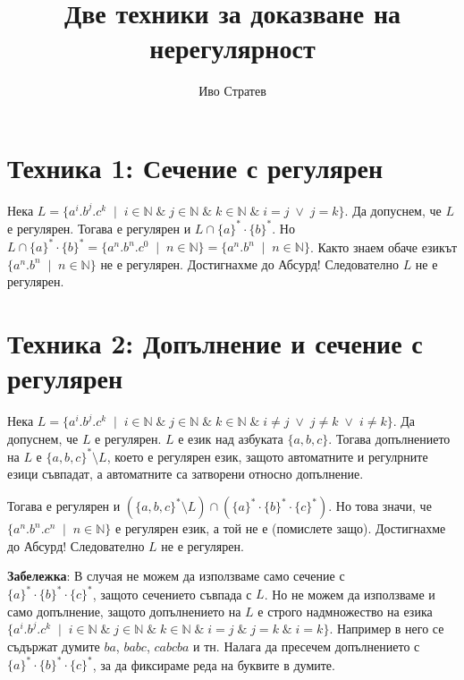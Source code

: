 \documentclass[12pt]{article}
\title{Две техники за доказване на нерегулярност}
\author{Иво Стратев}
\begin{document}
\maketitle

\section*{Техника 1: Сечение с регулярен}

Нека \(L = \{a^i.b^j.c^k \;\mid\; i \in \mathbb{N} \;\&\; j \in \mathbb{N} \;\&\; k \in \mathbb{N} \;\&\; i = j \;\lor\; j = k\}\).
Да допуснем, че \(L\) е регулярен.
Тогава е регулярен и \(L \cap \{a\}^*\cdot\{b\}^*\).
Но \(L \cap \{a\}^*\cdot\{b\}^* = \{a^n.b^n.c^0 \;\mid\; n \in \mathbb{N}\} = \{a^n.b^n \;\mid\; n \in \mathbb{N}\}\).
Както знаем обаче езикът \(\{a^n.b^n \;\mid\; n \in \mathbb{N}\}\) не е регулярен.
Достигнахме до Абсурд!
Следователно \(L\) не е регулярен.

\section*{Техника 2: Допълнение и сечение с регулярен}
Нека \(L = \{a^i.b^j.c^k \;\mid\; i \in \mathbb{N} \;\&\; j \in \mathbb{N} \;\&\; k \in \mathbb{N} \;\&\; i \neq j \;\lor\; j \neq k \;\lor\; i \neq k\}\).
Да допуснем, че \(L\) е регулярен.
\(L\) е език над азбуката \(\{a, b, c\}\).
Тогава допълнението на \(L\) е \(\{a, b, c\}^* \setminus L\), което е регулярен език,
защото автоматните и регулрните езици съвпадат, а автоматните са затворени относно допълнение.

\vspace*{5mm}

\par Тогава е регулярен и \((\{a, b, c\}^* \setminus L) \cap (\{a\}^*\cdot\{b\}^*\cdot\{c\}^*)\).
Но това значи, че \(\{a^n.b^n.c^n \;\mid\; n \in \mathbb{N}\}\) е регулярен език,
а той не е (помислете защо).
Достигнахме до Абсурд!
Следователно \(L\) не е регулярен.

\vspace*{5mm}

\par \textbf{Забележка}: В случая не можем да използваме само сечение с \\
\(\{a\}^*\cdot\{b\}^*\cdot\{c\}^*\),
защото сечението съвпада с \(L\). Но не можем да използваме и само допълнение, защото допълнението на \(L\) е строго надмножество на езика \(\{a^i.b^j.c^k \;\mid\; i \in \mathbb{N} \;\&\; j \in \mathbb{N} \;\&\; k \in \mathbb{N} \;\&\; i = j \;\&\; j = k \;\&\; i = k\}\). Например в него се съдържат думите \(ba\), \(babc\), \(cabcba\) и тн.
Налага да пресечем допълнението с \(\{a\}^*\cdot\{b\}^*\cdot\{c\}^*\), за да фиксираме реда на буквите в думите.
\end{document}

